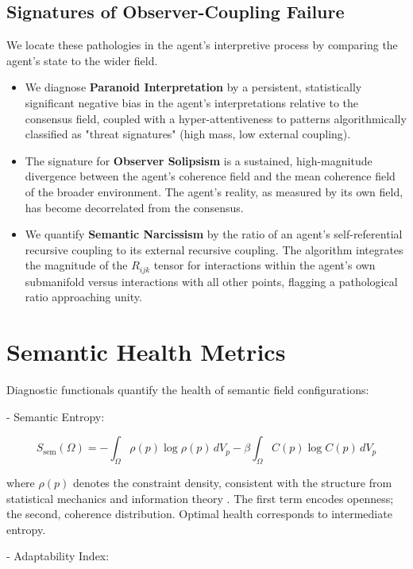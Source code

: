 \subsection{Signatures of Observer-Coupling Failure}
We locate these pathologies in the agent's interpretive process by comparing the agent's state to the wider field.
\begin{itemize}
    \item We diagnose \textbf{Paranoid Interpretation} by a persistent, statistically significant negative bias in the agent's interpretations relative to the consensus field, coupled with a hyper-attentiveness to patterns algorithmically classified as "threat signatures" (high mass, low external coupling).
    \item The signature for \textbf{Observer Solipsism} is a sustained, high-magnitude divergence between the agent's coherence field and the mean coherence field of the broader environment. The agent's reality, as measured by its own field, has become decorrelated from the consensus.
    \item We quantify \textbf{Semantic Narcissism} by the ratio of an agent's self-referential recursive coupling to its external recursive coupling. The algorithm integrates the magnitude of the \(R_{ijk}\) tensor for interactions within the agent's own submanifold versus interactions with all other points, flagging a pathological ratio approaching unity.
\end{itemize}

\section{Semantic Health Metrics}

Diagnostic functionals quantify the health of semantic field configurations:

- Semantic Entropy:

\begin{equation}
S_{\text{sem}}(\Omega) = -\int_{\Omega} \rho(p) \log\rho(p) \, dV_p - \beta \int_{\Omega} C(p) \log C(p) \, dV_p
\end{equation}

where $\rho(p)$ denotes the constraint density, consistent with the structure from statistical mechanics and information theory \autocite{Shannon1948, CoverThomas2006, Reif1965, PathriaBeale2011}. The first term encodes openness; the second, coherence distribution. Optimal health corresponds to intermediate entropy.

- Adaptability Index:

